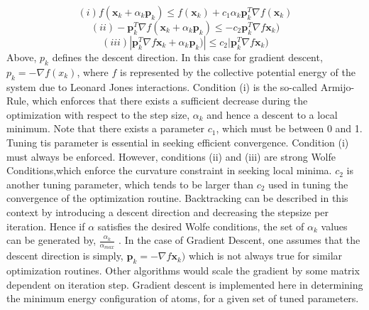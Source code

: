 \documentclass{article}
\begin{document}
$$ (i)   f(\mathbf{x}_{k} + \alpha_{k}\mathbf{p}_{k}) \leq f(\mathbf{x}_{k}) + c_{1} \alpha_{k}\mathbf{p}_{k}^{T}\nabla f(\mathbf{x}_{k}) $$
 $$ (ii)  -\mathbf{p}_{k}^{T}\nabla f(\mathbf{x}_{k}+\alpha_{k}\mathbf{p}_{k})  \leq 
-c_{2} \mathbf{p}_{k}^{T}\nabla f\mathbf{x}_{k}) $$
$$ (iii) |\mathbf{p}_{k}^{T} \nabla f\mathbf{x}_{k}+\alpha_{k}\mathbf{p}_{k} )| \leq c_{2}| \mathbf{p}_{k}^{T}\nabla f\mathbf{x}_{k})$$  
Above, $p_{k}$  defines the descent direction. In this case for gradient descent, $p_{k}=-\nabla f(x_{k})$, where $f$ is represented by the collective potential energy of the system due to Leonard Jones interactions. Condition (i) is the so-called Armijo-Rule, which enforces that there exists a sufficient decrease during the optimization with respect to the step size, $\alpha_{k}$ and hence a descent to a local minimum. Note that there exists a parameter $c_{1}$, which must  be between 0 and 1. Tuning tis parameter is essential in seeking efficient convergence. Condition (i) must always be enforced. However, conditions (ii) and (iii) are strong Wolfe Conditions,which enforce the curvature constraint in seeking local minima. $c_{2}$ is another tuning parameter, which tends to be larger than $c_{2}$ used in tuning the convergence of the optimization routine. Backtracking can be described in this context by introducing a descent direction and decreasing the stepsize  per iteration. Hence if $\alpha$ satisfies the desired Wolfe conditions, the set of $\alpha_{k}$ values can be generated by, 
$ \frac{\alpha_{k}}{\alpha_{max}}$ .  
In the case of Gradient Descent, one assumes that the descent direction is simply, $\mathbf{p}_{k}  = -\nabla f\mathbf{x}_{k})$ which is not always true for similar optimization routines. Other algorithms would scale the gradient by some matrix dependent on iteration step. Gradient descent is implemented here in determining the minimum energy configuration of atoms, for a given set of tuned parameters. 
  
\end{document}
